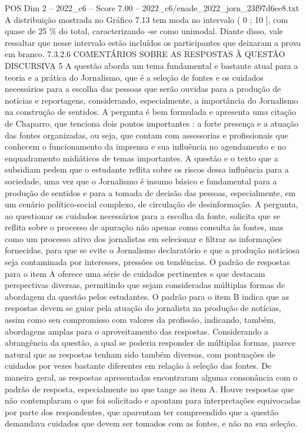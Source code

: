 \begin{textsample}{POS Dim 2 – 2022\_c6 – Score 7.00 – 2022\_c6/enade\_2022\_jorn\_23f97d6ee8.txt}
A distribuição mostrada no Gráfico 7.13 tem moda no intervalo ( 0 ; 10 ], com quase de 25 \% do total, caracterizando -se como unimodal.
Diante disso, vale ressaltar que nesse intervalo estão incluídos os participantes que deixaram a prova em branco. 7.3.2.6 COMENTÁRIOS SOBRE AS RESPOSTAS À QUESTÃO DISCURSIVA 5 A questão aborda um tema fundamental e bastante atual para a teoria e a prática do Jornalismo, que é a seleção de fontes e os cuidados necessários para a escolha das pessoas que serão ouvidas para a produção de notícias e reportagens, considerando, especialmente, a importância do Jornalismo na construção de sentidos.
A pergunta é bem formulada e apresenta uma citação de Chaparro, que tenciona dois pontos importantes : a forte presença e a atuação das fontes organizadas, ou seja, que contam com assessorias e profissionais que conhecem o funcionamento da imprensa e sua influência no agendamento e no enquadramento midiáticos de temas importantes.
A questão e o texto que a subsidiam pedem que o estudante reflita sobre os riscos dessa influência para a sociedade, uma vez que o Jornalismo é insumo básico e fundamental para a produção de sentidos e para a tomada de decisão das pessoas, especialmente, em um cenário político-social complexo, de circulação de desinformação.
A pergunta, ao questionar os cuidados necessários para a escolha da fonte, solicita que se reflita sobre o processo de apuração não apenas como consulta às fontes, mas como um processo ativo dos jornalistas em selecionar e filtrar as informações fornecidas, para que se evite o Jornalismo declaratório e que a produção noticiosa seja contaminada por interesses, pressões ou tendências.
O padrão de respostas para o item A oferece uma série de cuidados pertinentes e que destacam perspectivas diversas, permitindo que sejam consideradas múltiplas formas de abordagem da questão pelos estudantes.
O padrão para o item B indica que as respostas devem se guiar pela atuação do jornalista na produção de notícias, assim como seu compromisso com valores da profissão, indicando, também, abordagens amplas para o aproveitamento das respostas.
Considerando a abrangência da questão, a qual se poderia responder de múltiplas formas, parece natural que as respostas tenham sido também diversas, com pontuações de cuidados por vezes bastante diferentes em relação à seleção das fontes.
De maneira geral, as respostas apresentadas encontraram alguma consonância com o padrão de resposta, especialmente no que tange ao item A.
Houve respostas que não contemplaram o que foi solicitado e apontam para interpretações equivocadas por parte dos respondentes, que aparentam ter compreendido que a questão demandava cuidados que devem ser tomados com as fontes, e não na sua seleção.

\end{textsample}

